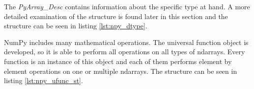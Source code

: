 
The \textit{PyArray\_Desc} contains information about the specific
type at hand. A more detailed examination of the structure is found
later in this section and the structure can be seen in
listing \ref{lst:npy_dtype}.



NumPy includes many mathematical operations. The universal function
object is developed, so it is able to perform all operations on all
types of ndarrays. Every function is an instance of this object and
each of them performs element by element operations on one or multiple
ndarrays. The structure can be seen in listing \ref{lst:npy_ufunc_st}.







